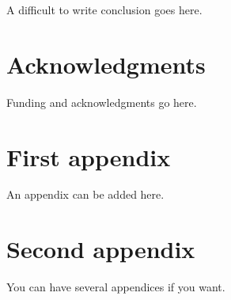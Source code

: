 \documentclass{article}
\begin{document}
A difficult to write conclusion goes here.

\section*{Acknowledgments}

Funding and acknowledgments go here.




\begin{appendices}
\section{First appendix\label{sec:first_appx}}
An appendix can be added here.
\section{Second appendix\label{sec:second_appx}}
You can have several appendices if you want.
\end{appendices}
\end{document}
